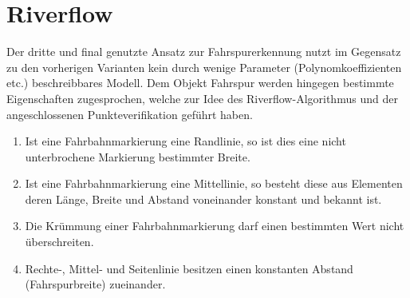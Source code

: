 \section{Riverflow}
Der dritte und final genutzte Ansatz zur Fahrspurerkennung nutzt im Gegensatz zu den vorherigen Varianten kein durch wenige Parameter (Polynomkoeffizienten etc.) beschreibbares Modell. Dem Objekt Fahrspur werden hingegen bestimmte Eigenschaften zugesprochen, welche zur Idee des Riverflow-Algorithmus \autocite{limRiverFlowLane2012} und der angeschlossenen Punkteverifikation geführt haben.
\begin{enumerate}
\item \label{item:riverflow:rule:solidline}
Ist eine Fahrbahnmarkierung eine Randlinie, so ist dies eine nicht unterbrochene Markierung bestimmter Breite.
\item \label{item:riverflow:rule:dashedline}
Ist eine Fahrbahnmarkierung eine Mittellinie, so besteht diese aus Elementen deren Länge, Breite und Abstand voneinander konstant und bekannt ist.
\item \label{item:riverflow:rule:curvature}
Die Krümmung einer Fahrbahnmarkierung darf einen bestimmten Wert nicht überschreiten.
\item \label{item:riverflow:rule:distance}
Rechte-, Mittel- und Seitenlinie besitzen einen konstanten Abstand (Fahrspurbreite) zueinander.
\end{enumerate} 


%